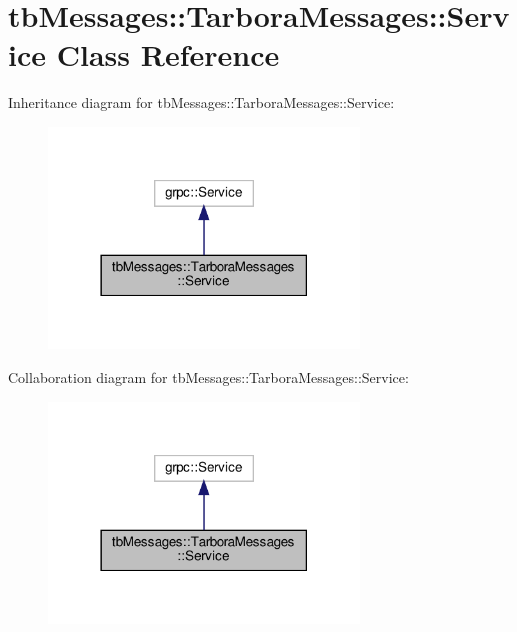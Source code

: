 \hypertarget{classtbMessages_1_1TarboraMessages_1_1Service}{}\section{tb\+Messages\+:\+:Tarbora\+Messages\+:\+:Service Class Reference}
\label{classtbMessages_1_1TarboraMessages_1_1Service}


Inheritance diagram for tb\+Messages\+:\+:Tarbora\+Messages\+:\+:Service\+:
\nopagebreak
\begin{figure}[H]
\begin{center}
\leavevmode
\includegraphics[width=234pt]{classtbMessages_1_1TarboraMessages_1_1Service__inherit__graph}
\end{center}
\end{figure}


Collaboration diagram for tb\+Messages\+:\+:Tarbora\+Messages\+:\+:Service\+:
\nopagebreak
\begin{figure}[H]
\begin{center}
\leavevmode
\includegraphics[width=234pt]{classtbMessages_1_1TarboraMessages_1_1Service__coll__graph}
\end{center}
\end{figure}

